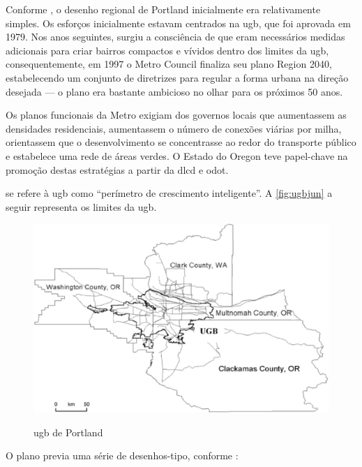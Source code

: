 	Conforme , o desenho regional de Portland inicialmente era relativamente simples. Os esforços inicialmente estavam centrados na \gls{ugb}, que foi aprovada em 1979. Nos anos seguintes, surgiu a consciência de que eram necessários medidas adicionais para criar bairros compactos e vívidos dentro dos limites da \gls{ugb}, consequentemente, em 1997 o Metro Council finaliza seu plano Region 2040, estabelecendo um conjunto de diretrizes para regular a forma urbana na direção desejada --- o plano era bastante ambicioso no olhar para os próximos 50 anos.
	
	Os planos funcionais da Metro exigiam dos governos locais que aumentassem as densidades residenciais, aumentassem o número de conexões viárias por milha, orientassem que o desenvolvimento se concentrasse ao redor do transporte público e estabelece uma rede de áreas verdes. O Estado do Oregon teve papel-chave na promoção destas estratégias a partir da \gls{dlcd} e \gls{odot}.
	
	 se refere à \gls{ugb} como “perímetro de crescimento inteligente”. A \autoref{fig:ugbjun} a seguir representa os limites da \gls{ugb}.
	
	\begin{figure}
		\centering
		\caption{\glsdesc{ugb} de Portland}
		\includegraphics[width=0.9\linewidth]{img/jun2004a_01}
		\label{fig:ugbjun}
	\end{figure}
	
	O plano previa uma série de desenhos-tipo, conforme \cite[p. 10--11, tradução e grifo nossos]{metro2000a}:
	
